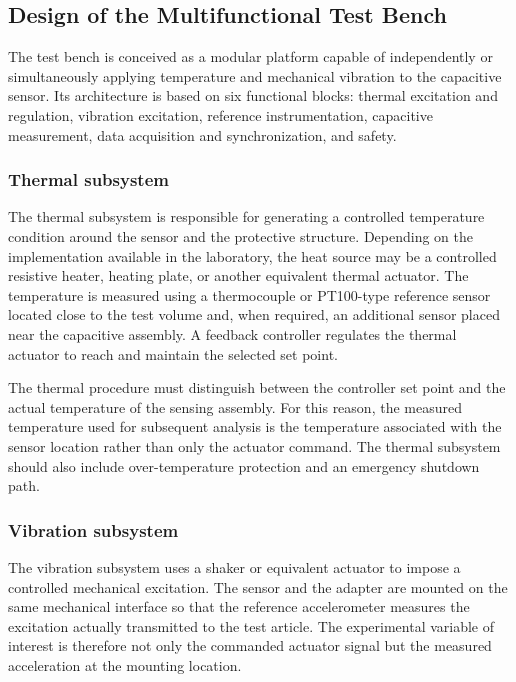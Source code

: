 \documentclass[conference]{IEEEtran}
\begin{document}
\subsection{Design of the Multifunctional Test Bench}

The test bench is conceived as a modular platform capable of independently or simultaneously applying temperature and mechanical vibration to the capacitive sensor. Its architecture is based on six functional blocks: thermal excitation and regulation, vibration excitation, reference instrumentation, capacitive measurement, data acquisition and synchronization, and safety.

\subsubsection{Thermal subsystem}

The thermal subsystem is responsible for generating a controlled temperature condition around the sensor and the protective structure. Depending on the implementation available in the laboratory, the heat source may be a controlled resistive heater, heating plate, or another equivalent thermal actuator. The temperature is measured using a thermocouple or PT100-type reference sensor located close to the test volume and, when required, an additional sensor placed near the capacitive assembly. A feedback controller regulates the thermal actuator to reach and maintain the selected set point.

The thermal procedure must distinguish between the controller set point and the actual temperature of the sensing assembly. For this reason, the measured temperature used for subsequent analysis is the temperature associated with the sensor location rather than only the actuator command. The thermal subsystem should also include over-temperature protection and an emergency shutdown path.

\subsubsection{Vibration subsystem}

The vibration subsystem uses a shaker or equivalent actuator to impose a controlled mechanical excitation. The sensor and the adapter are mounted on the same mechanical interface so that the reference accelerometer measures the excitation actually transmitted to the test article. The experimental variable of interest is therefore not only the commanded actuator signal but the measured acceleration at the mounting location.
\end{document}
